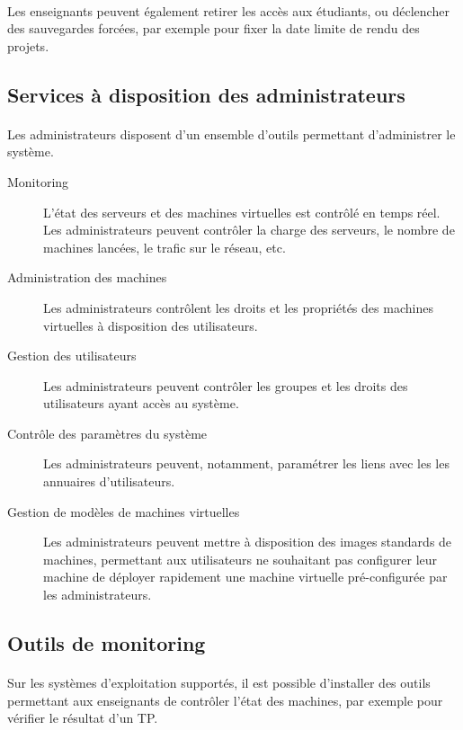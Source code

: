 \paragraph{} Les enseignants peuvent également retirer les accès aux étudiants,
ou déclencher des sauvegardes forcées, par exemple pour fixer la date limite de rendu des projets.

\subsection{Services à disposition des administrateurs}

\paragraph{} Les administrateurs disposent d'un ensemble d'outils permettant
d'administrer le système.

\begin{description}
  \item[Monitoring] L'état des serveurs et des machines virtuelles est contrôlé
  en temps réel. Les administrateurs peuvent contrôler la charge des serveurs,
  le nombre de machines lancées, le trafic sur le réseau, etc.
  \item[Administration des machines] Les administrateurs contrôlent les droits
  et les propriétés des machines virtuelles à disposition des utilisateurs.
  \item[Gestion des utilisateurs] Les administrateurs peuvent contrôler les
  groupes et les droits des utilisateurs ayant accès au système.
  \item[Contrôle des paramètres du système] Les administrateurs peuvent,
  notamment, paramétrer les liens avec les les annuaires d'utilisateurs.
  \item[Gestion de modèles de machines virtuelles] Les administrateurs peuvent
  mettre à disposition des images standards de machines, permettant aux
  utilisateurs ne souhaitant pas configurer leur machine de déployer rapidement
  une machine virtuelle pré-configurée par les administrateurs.
\end{description}

\subsection{Outils de monitoring}

\paragraph{} Sur les systèmes d'exploitation supportés, il est possible
d'installer des outils permettant aux enseignants de contrôler l'état des
machines, par exemple pour vérifier le résultat d'un TP.

